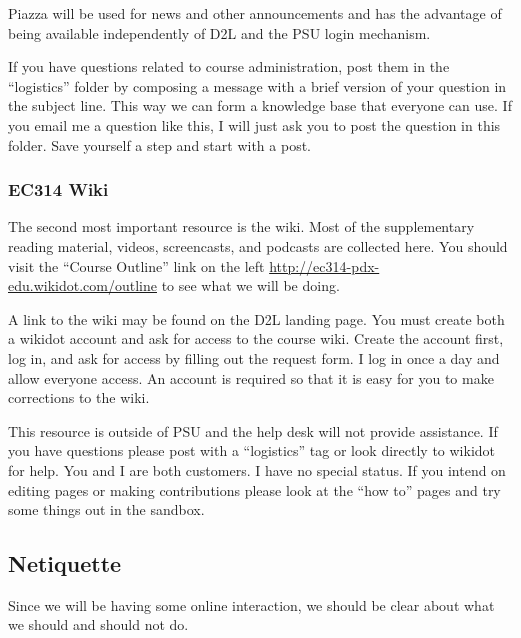 \documentclass[letterpaper,10pt]{article}
\begin{document}
Piazza will be used for news and other announcements and has the advantage of being available independently of D2L and the PSU login mechanism.  

If you have questions related to course administration, post them in
the ``logistics'' folder by composing a message with a brief version of your question in the subject line. This way we can form a knowledge base that everyone can use.  If you email me a question like this, I will just ask you to post the question in this folder.  Save yourself a step and start with a post.



\subsubsection{EC314 Wiki}
The second most important resource is the wiki.  Most of the
supplementary reading material, videos, screencasts, and podcasts are
collected here. You should visit the ``Course Outline'' link on the
left \url{http://ec314-pdx-edu.wikidot.com/outline} to see what we will be
doing.

A link to the wiki may be found on the D2L landing page.  You must create both a wikidot account and ask for access to the course wiki.  Create the account first, log in, and ask for access by filling out the request form.  I log in once a day and allow everyone access.  An account is required so that it is easy for you to make corrections to the wiki.

This resource is outside of PSU and the help desk will not provide
assistance.  If you have questions please post with a  
``logistics'' tag or look directly to wikidot
for help.  You and I are both customers. I have no special status.
If you intend on editing pages or making contributions please look at
the ``how to'' pages and try some things out in the sandbox.

\subsection{Netiquette}
Since we will be having some online interaction, we should be clear
about what we should and should not do.
\end{document}
